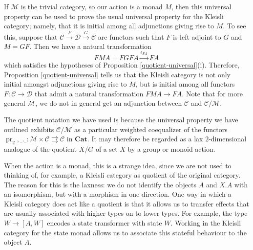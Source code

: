 \documentclass{svproc}
\newcommand\C{\mathcal{C}}
\newcommand\D{\mathcal{D}}
\newcommand\M{\mathcal{M}}
\DeclareMathOperator\pr{pr}
\newcommand*\from{\colon}
\newcommand{\0}{{\mathtt{0}}} \newcommand{\com}{{\mathtt{com}}}
\newcommand{\catname}[1]{\mathbf{#1}}
\newcommand{\Cat}{\catname{Cat}}
\begin{document}
\begin{remark}
  If $\M$ is the trivial category, so our action is a monad $M$, then this universal property can be used to prove the usual universal property for the Kleisli category; namely, that it is initial among all adjunctions giving rise to $M$.  
  To see this, suppose that $\C \xrightarrow{F} \D \xrightarrow{G} \C$ are functors such that $F$ is left adjoint to $G$ and $M=GF$.  
  Then we have a natural transformation
  \[
    FMA = FGF A \xrightarrow{\epsilon_{F A}} F A\,
    \]
  which satisfies the hypotheses of Proposition \ref{quotient-universal}(i).  
  Therefore, Proposition \ref{quotient-universal} tells us that the Kleisli category is not only initial amongst adjunctions giving rise to $M$, but is initial among all functors $F\from \C \to \D$ that admit a natural transformation $FMA \to FA$.
  Note that for more general $\M$, we do not in general get an adjunction between $\C$ and $\C/\M$.

  The quotient notation we have used is because the universal property we have outlined exhibits $\C/\M$ as a particular weighted coequalizer of the functors $\pr_2,\_.\_\from \M\times\C \rightrightarrows \C$ in $\Cat$.
  It may therefore be regarded as a lax $2$-dimensional analogue of the quotient $X/G$ of a set $X$ by a group or monoid action.  
  
  When the action is a monad, this is a strange idea, since we are not used to thinking of, for example, a Kleisli category as quotient of the original category.  
  The reason for this is the laxness: we do not identify the objects $A$ and $X.A$ with an isomorphism, but with a morphism in one direction.  
  One way in which a Kleisli category does act like a quotient is that it allows us to transfer effects that are usually associated with higher types on to lower types.  
  For example, the type $W\to [A,W]$ encodes a state transformer with state $W$.  
  Working in the Kleisli category for the state monad allows us to associate this stateful behaviour to the object $A$.
\end{remark}
\end{document}
